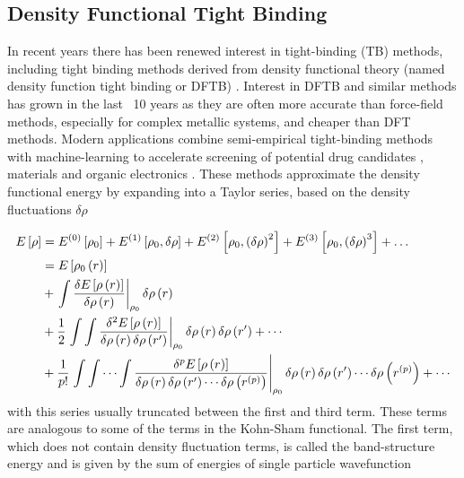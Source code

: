 \subsection{Density Functional Tight Binding}
\label{subsec:tight_binding}
In recent years there has been renewed interest in tight-binding (TB) methods, including
tight binding methods derived from density functional theory (named density function 
tight binding or DFTB) \cite{Porezag1994}. Interest in DFTB and similar methods 
has grown in the last ~10 years as they are often more accurate than force-field
methods, especially for complex metallic systems, and cheaper than DFT methods. 
Modern applications combine semi-empirical tight-binding methods with machine-learning
to accelerate screening of potential drug candidates \cite{Qiao2020}, materials 
\cite{Hegde2017} and organic electronics \cite{Omar2021}. These methods approximate 
the density functional energy by expanding into a Taylor series, based on the density
fluctuations $\delta\rho$

\begin{equation}
    \begin{split}
    E\left[\rho\right] &= E^{\left(0\right)}\left[\rho_0\right] + E^{\left(1\right)}\left[\rho_0, \delta\rho\right] + E^{\left(2\right)}\left[\rho_0, \left(\delta\rho\right)^2\right] + E^{\left(3\right)}\left[\rho_0, \left(\delta\rho\right)^3\right] + \dots \\
    &= E_{} \left[ \rho_0\left(r\right) \right] \\
    &+ \left. \int \frac{\delta E_{} \left[ \rho\left(r\right) \right]}{\delta \rho\left(r\right)} \right\rvert_{\rho_0}  \delta \rho \left( r \right) \\
    &+ \frac{1}{2} \left. \int\int \frac{\delta^2 E_{} \left[ \rho\left(r\right) \right]}{\delta \rho\left(r\right)\delta \rho\left(r^\prime\right)} \right\rvert_{\rho_0} \delta \rho \left( r \right) \delta \rho \left( r^\prime \right) + \cdots \\
    &+ \frac{1}{p!} \left. \int\int \cdots\int \frac{\delta^p E_{} \left[ \rho\left(r\right) \right]}{\delta \rho\left(r\right)\delta \rho\left(r^\prime\right) \cdots \delta \rho\left(r^{\left(p\right)}\right)} \right\rvert_{\rho_0} \delta \rho \left( r \right) \delta \rho \left( r^\prime \right) \cdots \delta \rho\left(r^{\left(p\right)}\right) + \cdots
    \end{split}
\end{equation}
%
with this series usually truncated between the first and third term\cite{Gaus2011, Koskinen2009}. 
These terms are analogous to some of the terms in the Kohn-Sham functional. The 
first term, which does not contain density fluctuation terms, is called the band-structure
energy and is given by the sum of energies of single particle wavefunction

